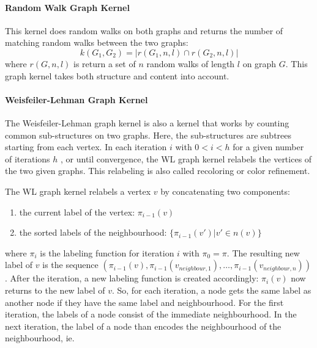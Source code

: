 
\paragraph{Random Walk Graph Kernel}
This kernel does random walks on both graphs and returns the number of matching random walks between the two graphs:
\begin{equation*}
    k(G_1, G_2) = |r(G_1, n, l) \cap r(G_2, n, l)|
\end{equation*}
where $r(G, n, l)$ is return a set of $n$ random walks of length $l$ on graph $G$.
This graph kernel takes both structure and content into account.

\paragraph{Weisfeiler-Lehman Graph Kernel}
The Weisfeiler-Lehman graph kernel is also a kernel that works by counting common sub-structures on two graphs.
Here, the sub-structures are subtrees starting from each vertex.
In each iteration $i$ with $0 < i < h$ for a given number of iterations $h$ , or until convergence, the WL graph kernel relabels the vertices of the two given graphs.
This relabeling is also called recoloring or color refinement.

The WL graph kernel relabels a vertex $v$ by concatenating two components:
\begin{enumerate}
    \item{the current label of the vertex: $\pi_{i-1}(v)$}
    \item{the sorted labels of the neighbourhood: $\{ \pi_{i-1}(v') | v' \in n(v) \}$}
\end{enumerate}
where $\pi_{i}$ is the labeling function for iteration $i$ with $\pi_0 = \pi$.
The resulting new label of $v$ is the sequence $(\pi_{i-1}(v), \pi_{i-1}(v_{neighbour,1}), \dots , \pi_{i-1}(v_{neighbour,n}))$.
After the iteration, a new labeling function is created accordingly: $\pi_i(v)$ now returns to the new label of $v$.
So, for each iteration, a node gets the same label as another node if they have the same label and neighbourhood.
For the first iteration, the labels of a node consist of the immediate neighbourhood.
In the next iteration, the label of a node than encodes the neighbourhood of the neighbourhood, ie. 

